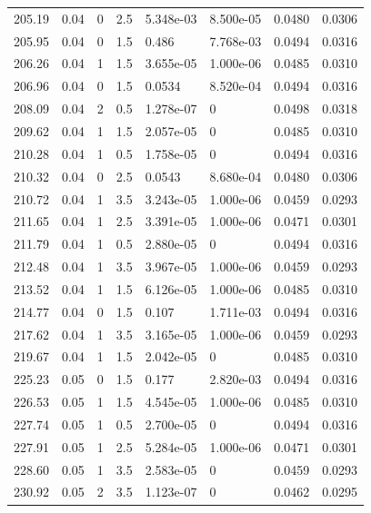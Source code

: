 \documentclass[preview]{standalone}
\begin{document}
{{{\begin{tabular}{L{1.2cm}C{1.2cm} C{0.3cm}C{0.5cm} C{1.4cm}C{1.4cm} C{1.4cm}C{1.4cm}}
  205.19  &  0.04  & 0     & 2.5 &  5.348e-03  & 8.500e-05  & 0.0480 &  0.0306   \\ 
  205.95  &  0.04  & 0     & 1.5 &  0.486  & 7.768e-03  & 0.0494 &  0.0316   \\ 
  206.26  &  0.04  & 1     & 1.5 &  3.655e-05  & 1.000e-06  & 0.0485 &  0.0310   \\ 
  206.96  &  0.04  & 0     & 1.5 &  0.0534  & 8.520e-04  & 0.0494 &  0.0316   \\ 
  208.09  &  0.04  & 2     & 0.5 &  1.278e-07  & 0  & 0.0498 &  0.0318   \\ 
  209.62  &  0.04  & 1     & 1.5 &  2.057e-05  & 0  & 0.0485 &  0.0310   \\ 
  210.28  &  0.04  & 1     & 0.5 &  1.758e-05  & 0  & 0.0494 &  0.0316   \\ 
  210.32  &  0.04  & 0     & 2.5 &  0.0543  & 8.680e-04  & 0.0480 &  0.0306   \\ 
  210.72  &  0.04  & 1     & 3.5 &  3.243e-05  & 1.000e-06  & 0.0459 &  0.0293   \\ 
  211.65  &  0.04  & 1     & 2.5 &  3.391e-05  & 1.000e-06  & 0.0471 &  0.0301   \\ 
  211.79  &  0.04  & 1     & 0.5 &  2.880e-05  & 0  & 0.0494 &  0.0316   \\ 
  212.48  &  0.04  & 1     & 3.5 &  3.967e-05  & 1.000e-06  & 0.0459 &  0.0293   \\ 
  213.52  &  0.04  & 1     & 1.5 &  6.126e-05  & 1.000e-06  & 0.0485 &  0.0310   \\ 
  214.77  &  0.04  & 0     & 1.5 &  0.107  & 1.711e-03  & 0.0494 &  0.0316   \\ 
  217.62  &  0.04  & 1     & 3.5 &  3.165e-05  & 1.000e-06  & 0.0459 &  0.0293   \\ 
  219.67  &  0.04  & 1     & 1.5 &  2.042e-05  & 0  & 0.0485 &  0.0310   \\ 
  225.23  &  0.05  & 0     & 1.5 &  0.177  & 2.820e-03  & 0.0494 &  0.0316   \\ 
  226.53  &  0.05  & 1     & 1.5 &  4.545e-05  & 1.000e-06  & 0.0485 &  0.0310   \\ 
  227.74  &  0.05  & 1     & 0.5 &  2.700e-05  & 0  & 0.0494 &  0.0316   \\ 
  227.91  &  0.05  & 1     & 2.5 &  5.284e-05  & 1.000e-06  & 0.0471 &  0.0301   \\ 
  228.60  &  0.05  & 1     & 3.5 &  2.583e-05  & 0  & 0.0459 &  0.0293   \\ 
  230.92  &  0.05  & 2     & 3.5 &  1.123e-07  & 0  & 0.0462 &  0.0295   \\ 

\end{tabular}}}}
\end{document}
